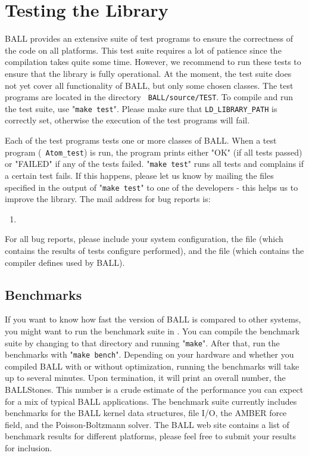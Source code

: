 \section{Testing the Library}

BALL provides an extensive suite of test programs to ensure the correctness of
the code on all platforms. This test suite requires a lot of patience since
the compilation takes quite some time. However, we recommend to run these
tests to ensure that the library is fully operational. At the moment, the test
suite does not yet cover all functionality of BALL, but only some chosen
classes.  The test programs are located in the directory {\tt
BALL/source/TEST}.  To compile and run the test suite, use "{\tt make test}".
Please make sure that {\tt LD\_LIBRARY\_PATH} is correctly set, otherwise the
execution of the test programs will fail.

Each of the test programs tests one or more classes of BALL. When a test
program (\eg~{\tt Atom\_test}) is run, the program prints either "OK" (if all
tests passed) or "FAILED" if any of the tests failed. "{\tt make test}" runs
all tests and complains if a certain test fails.  If this happens, please let
us know by mailing the files specified in the output of "{\tt make test}" to
one of the developers - this helps us to improve the library.  The mail
address for bug reports is:
\begin{enumerate}
	\item[] 
\end{enumerate}

\noindent
For all bug reports, please include your system configuration, the file
 (which contains the results of tests configure performed),
and the file  (which contains the compiler
defines used by BALL).

\subsection{Benchmarks}

If you want to know how fast the version of BALL is compared to other systems,
you might want to run the benchmark suite in .
You can compile the benchmark suite by changing to that directory and running
"{\tt make}". After that, run the benchmarks with "{\tt make bench}".
Depending on your hardware and whether you compiled BALL with or without
optimization, running the benchmarks will take up to several minutes. Upon
termination, it will print an overall number, the BALLStones. This number is a
crude estimate of the performance you can expect for a mix of typical BALL
applications. The benchmark suite currently includes benchmarks for the BALL
kernel data structures, file I/O, the AMBER force field, and the
Poisson-Boltzmann solver. The BALL web site contains a list of benchmark
results for different platforms, please feel free to submit your results for
inclusion.
